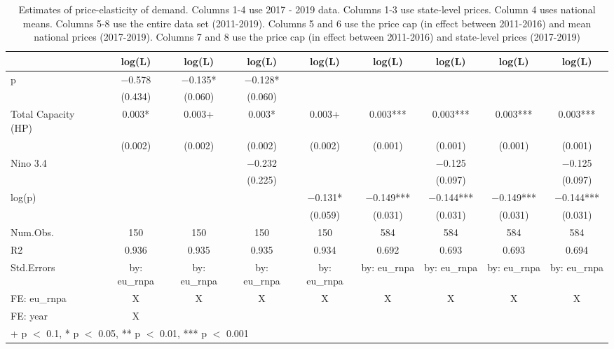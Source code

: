 \begin{table}

\caption{\label{tab:}Estimates of price-elasticity of demand.
             Columns 1-4 use 2017 - 2019 data.
             Columns 1-3 use state-level prices. Column 4 uses national means.
             Columns 5-8 use the entire data set (2011-2019).
             Columns 5 and 6 use the price cap (in effect between 2011-2016) and mean national prices (2017-2019).
             Columns 7 and 8 use the price cap (in effect between 2011-2016) and state-level prices (2017-2019)}
\centering
\begin{tabular}[t]{lcccccccc}
\toprule
  & log(L) & log(L)  & log(L)   & log(L)    & log(L)     & log(L)      & log(L)       & log(L)       \\
\midrule
p & \num{-0.578} & \num{-0.135}* & \num{-0.128}* &  &  &  &  & \\
 & (\num{0.434}) & (\num{0.060}) & (\num{0.060}) &  &  &  &  & \\
Total Capacity (HP) & \num{0.003}* & \num{0.003}+ & \num{0.003}* & \num{0.003}+ & \num{0.003}*** & \num{0.003}*** & \num{0.003}*** & \num{0.003}***\\
 & (\num{0.002}) & (\num{0.002}) & (\num{0.002}) & (\num{0.002}) & (\num{0.001}) & (\num{0.001}) & (\num{0.001}) & (\num{0.001})\\
Nino 3.4 &  &  & \num{-0.232} &  &  & \num{-0.125} &  & \num{-0.125}\\
 &  &  & (\num{0.225}) &  &  & (\num{0.097}) &  & (\num{0.097})\\
log(p) &  &  &  & \num{-0.131}* & \num{-0.149}*** & \num{-0.144}*** & \num{-0.149}*** & \num{-0.144}***\\
 &  &  &  & (\num{0.059}) & (\num{0.031}) & (\num{0.031}) & (\num{0.031}) & (\num{0.031})\\
\midrule
Num.Obs. & \num{150} & \num{150} & \num{150} & \num{150} & \num{584} & \num{584} & \num{584} & \num{584}\\
R2 & \num{0.936} & \num{0.935} & \num{0.935} & \num{0.934} & \num{0.692} & \num{0.693} & \num{0.693} & \num{0.694}\\
Std.Errors & by: eu\_rnpa & by: eu\_rnpa & by: eu\_rnpa & by: eu\_rnpa & by: eu\_rnpa & by: eu\_rnpa & by: eu\_rnpa & by: eu\_rnpa\\
FE: eu_rnpa & X & X & X & X & X & X & X & X\\
FE: year & X &  &  &  &  &  &  & \\
\bottomrule
\multicolumn{9}{l}{\rule{0pt}{1em}+ p $<$ 0.1, * p $<$ 0.05, ** p $<$ 0.01, *** p $<$ 0.001}\\
\end{tabular}
\end{table}
